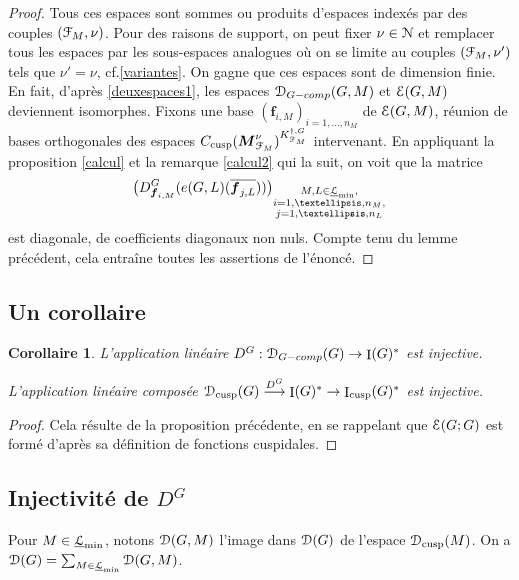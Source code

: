 \documentclass[11pt]{article}
\newcommand{\cf}{cf.\xspace}
\newcommand{\Subsection}{\subsection}
\newcommand{\skpt}{\smallskip}
\numberwithin{equation}{section}\providecommand{\og}{«\,}\providecommand{\fg}{\,»}
\let\mathcal \EuScript
\let\oldenumerate\enumerate
\renewcommand{\enumerate}{\oldenumerate\itemindent0pt}
\newenvironment{enumeratei}
{\bgroup\def\theenumi{\roman{enumi}}\def\theenumii{\arabic{enumii}}\oldenumerate}
{\endenumerate\egroup}
\def\To#1{\mathchoice{\xrightarrow{\textstyle\kern4pt#1\kern3pt}}{\stackrel{#1}{\longrightarrow}}{}{}}
\newcommand{\tcomp}{\textup{-comp}}
\newcommand{\cusp}{\mathrm{cusp}}
\DeclareMathOperator{\rI}{I}
\newcommand{\bmf}{\boldsymbol{f}}
\newcommand{\bM}{\boldsymbol{M}}
\newcommand{\cD}{\mathcal{D}}
\newcommand{\cE}{\mathcal{E}}
\newcommand{\cF}{\mathcal{F}}
\newcommand{\cL}{\mathcal{L}}
\newcommand{\cN}{\mathcal{N}}
\theoremstyle{plain}
\newtheorem*{cor*}{Corollaire}
\theoremstyle{definition}
\begin{document}
\begin{proof}
Tous ces espaces sont sommes ou produits d'espaces indexés par des couples $(\cF_{M},\nu)$. Pour des raisons de support, on peut fixer $\nu\in \cN$ et remplacer tous les espaces par les sous-espaces analogues où on se limite au couples $(\cF_{M},\nu')$ tels que $\nu'=\nu$, \cf \ref{variantes}. On gagne que ces espaces sont de dimension finie. En fait, d'après \eqref{deuxespaces1}, les espaces $\cD_{G\tcomp}(G,M)$ et $\cE(G,M)$ deviennent isomorphes. Fixons une base $(\bmf_{i,M})_{i=1,\dots,n_{M}}$ de $\cE(G,M)$, réunion de bases orthogonales des espaces $C_{\cusp}(\bM^{\nu}_{\cF_{M}})^{K_{\cF_{M}}^{\dag,G}}$ intervenant. En appliquant la proposition \ref{calcul} et la remarque \eqref{calcul2} qui la suit, on voit
que la matrice
\[
\big(D^G_{\bmf_{i,M}}(e(G,L)(\overline{\bmf_{j,L}}))\big)_{\substack{M,L\in \underline{\cL}_{\min},\\
i=1,\dots,n_{M},\\
j=1,\dots,n_{L}}}
\]
est diagonale, de coefficients diagonaux non nuls. Compte tenu du lemme précédent, cela entraîne toutes les assertions de l'énoncé.
\end{proof}

\Subsection{Un corollaire}\label{uncorollaire}

\skpt
\begin{cor*}
\begin{enumeratei}
\item\label{uncorollairei}
L'application linéaire $D^G:\cD_{G\tcomp}(G)\to \rI(G)^*$ est injective.

\item\label{uncorollaireii}
L'application linéaire composée $\cD_{\cusp}(G)\To{D^G}\rI(G)^*\to \rI_{\cusp}(G)^*$ est injective.
\end{enumeratei}
\end{cor*}

\begin{proof}
Cela résulte de la proposition précédente, en se rappelant que $\cE(G;G)$ est formé d'après sa définition de fonctions cuspidales.
\end{proof}

\subsection{Injectivité de \texorpdfstring{$D^G$}{DG}}\label{injectivite}
Pour $M\in \underline{\cL}_{\min}$, notons $\cD(G,M)$ l'image dans $\cD(G)$ de
l'espace $\cD_{\cusp}(M)$. On a $\cD(G)=\sum_{M\in \underline{\cL}_{\min}}\cD(G,M)$.
\end{document}
